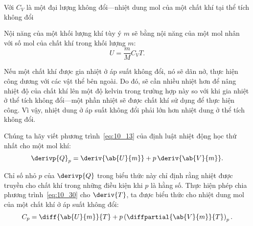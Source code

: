 Với $C_V$ là một đại lượng không đổi---nhiệt dung mol của một chất khí tại thể tích không đổi 


Nội năng của một khối lượng khí tùy ý $m$ sẽ bằng nội năng của một mol nhân với số mol của chất khí trong khối lượng $m$: 
\begin{equation}\label{eq:10_29}
	U = \frac{m}{M}C_V T.
\end{equation}


Nếu một chất khí được gia nhiệt ở áp suất không đổi, nó sẽ dãn nở, thực hiện công dương với các vật thể bên ngoài. Do đó, sẽ cần nhiều nhiệt hơn để nâng nhiệt độ của chất khí lên một độ kelvin trong trường hợp này so với khi gia nhiệt ở thể tích không đổi---một phần nhiệt sẽ được chất khí sử dụng để thực hiện công. Vì vậy, nhiệt dung ở áp suất không đổi phải lớn hơn nhiệt dung ở thể tích không đổi.


Chúng ta hãy viết phương trình~\eqref{eq:10_13} của định luật nhiệt động học thứ nhất cho một mol khí: 
\begin{equation}\label{eq:10_30}
	\derivp{Q}_p = \deriv{\ab{U}{m}} + p\,\deriv{\ab{V}{m}}.
\end{equation}

\noindent

Chỉ số nhỏ $p$ của $\derivp{Q}$ trong biểu thức này chỉ định rằng nhiệt được truyền cho chất khí trong những điều kiện khi $p$ là hằng số. Thực hiện phép chia phương trình~\eqref{eq:10_30} cho $\deriv{T}$, ta được biểu thức cho nhiệt dung mol của một chất khí ở áp suất không đổi:
\begin{equation}\label{eq:10_31}
	C_p = \diff{\ab{U}{m}}{T} + p\left(\diffpartial{\ab{V}{m}}{T}\right)_p.
\end{equation}

